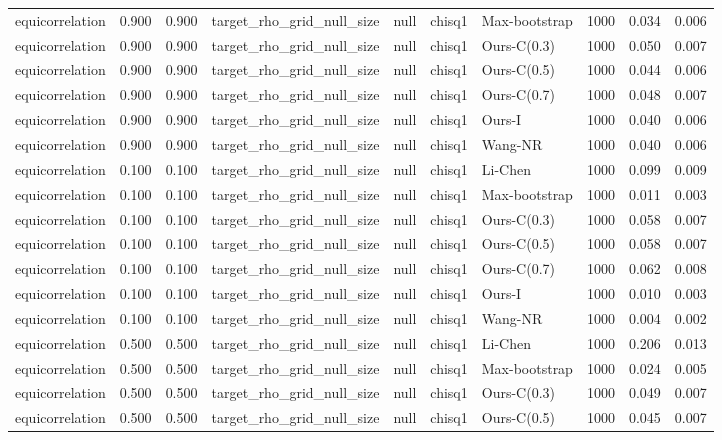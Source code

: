 \begin{tabular}{lrrllllrrr}
equicorrelation & 0.900 & 0.900 & target\_rho\_grid\_null\_size & null & chisq1 & Max-bootstrap & 1000 & 0.034 & 0.006 \\
equicorrelation & 0.900 & 0.900 & target\_rho\_grid\_null\_size & null & chisq1 & Ours-C(0.3) & 1000 & 0.050 & 0.007 \\
equicorrelation & 0.900 & 0.900 & target\_rho\_grid\_null\_size & null & chisq1 & Ours-C(0.5) & 1000 & 0.044 & 0.006 \\
equicorrelation & 0.900 & 0.900 & target\_rho\_grid\_null\_size & null & chisq1 & Ours-C(0.7) & 1000 & 0.048 & 0.007 \\
equicorrelation & 0.900 & 0.900 & target\_rho\_grid\_null\_size & null & chisq1 & Ours-I & 1000 & 0.040 & 0.006 \\
equicorrelation & 0.900 & 0.900 & target\_rho\_grid\_null\_size & null & chisq1 & Wang-NR & 1000 & 0.040 & 0.006 \\
equicorrelation & 0.100 & 0.100 & target\_rho\_grid\_null\_size & null & chisq1 & Li-Chen & 1000 & 0.099 & 0.009 \\
equicorrelation & 0.100 & 0.100 & target\_rho\_grid\_null\_size & null & chisq1 & Max-bootstrap & 1000 & 0.011 & 0.003 \\
equicorrelation & 0.100 & 0.100 & target\_rho\_grid\_null\_size & null & chisq1 & Ours-C(0.3) & 1000 & 0.058 & 0.007 \\
equicorrelation & 0.100 & 0.100 & target\_rho\_grid\_null\_size & null & chisq1 & Ours-C(0.5) & 1000 & 0.058 & 0.007 \\
equicorrelation & 0.100 & 0.100 & target\_rho\_grid\_null\_size & null & chisq1 & Ours-C(0.7) & 1000 & 0.062 & 0.008 \\
equicorrelation & 0.100 & 0.100 & target\_rho\_grid\_null\_size & null & chisq1 & Ours-I & 1000 & 0.010 & 0.003 \\
equicorrelation & 0.100 & 0.100 & target\_rho\_grid\_null\_size & null & chisq1 & Wang-NR & 1000 & 0.004 & 0.002 \\
equicorrelation & 0.500 & 0.500 & target\_rho\_grid\_null\_size & null & chisq1 & Li-Chen & 1000 & 0.206 & 0.013 \\
equicorrelation & 0.500 & 0.500 & target\_rho\_grid\_null\_size & null & chisq1 & Max-bootstrap & 1000 & 0.024 & 0.005 \\
equicorrelation & 0.500 & 0.500 & target\_rho\_grid\_null\_size & null & chisq1 & Ours-C(0.3) & 1000 & 0.049 & 0.007 \\
equicorrelation & 0.500 & 0.500 & target\_rho\_grid\_null\_size & null & chisq1 & Ours-C(0.5) & 1000 & 0.045 & 0.007 \\

\end{tabular}
